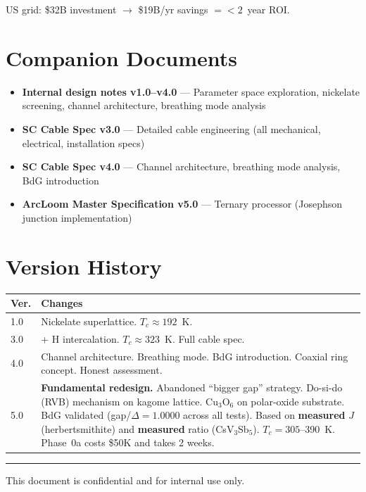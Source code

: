\documentclass[11pt, a4paper]{article}
\begin{document}
US grid: \$32B investment $\to$ \$19B/yr savings $= < 2$~year ROI.

\section{Companion Documents}

\begin{itemize}[nosep]
  \item \textbf{Internal design notes v1.0--v4.0} --- Parameter
        space exploration, nickelate screening, channel architecture,
        breathing mode analysis
  \item \textbf{SC Cable Spec v3.0} --- Detailed cable engineering
        (all mechanical, electrical, installation specs)
  \item \textbf{SC Cable Spec v4.0} --- Channel architecture,
        breathing mode analysis, BdG introduction
  \item \textbf{ArcLoom Master Specification v5.0} --- Ternary
        processor (Josephson junction implementation)
\end{itemize}

\section{Version History}

\begin{center}
\begin{tabular}{@{}lp{9cm}@{}}
\toprule
\textbf{Ver.} & \textbf{Changes} \\
\midrule
1.0 & Nickelate superlattice. $T_c \approx 192$~K. \\
3.0 & + H intercalation. $T_c \approx 323$~K. Full cable spec. \\
4.0 & Channel architecture. Breathing mode. BdG introduction.
      Coaxial ring concept. Honest assessment. \\
5.0 & \textbf{Fundamental redesign.} Abandoned ``bigger gap''
      strategy. Do-si-do (RVB) mechanism on kagome lattice.
      Cu$_3$O$_6$ on polar-oxide substrate. BdG validated
      (gap/$\Delta = 1.0000$ across all tests). Based on
      \textbf{measured} $J$ (herbertsmithite) and
      \textbf{measured} ratio (CsV$_3$Sb$_5$). $T_c = 305$--390~K.
      Phase~0a costs \$50K and takes 2 weeks. \\
\bottomrule
\end{tabular}
\end{center}

\vspace{2em}\hrule\vspace{0.5em}
{\color{nm-gray}\small This document is confidential and for
internal use only.}
\end{document}
